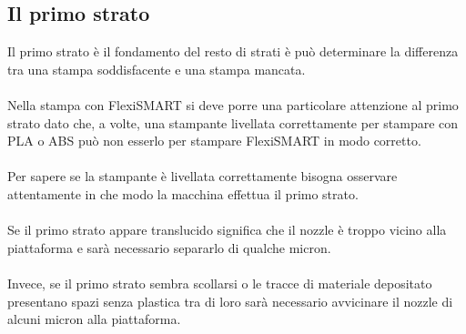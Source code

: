 \documentclass[11pt,a4paper]{article}
\begin{document}
	\subsection{Il primo strato}
Il primo strato è il fondamento del resto di strati è può determinare la differenza tra una stampa soddisfacente e una stampa mancata.
\\\\
Nella stampa con FlexiSMART si deve porre una particolare attenzione al primo strato dato che, a volte, una stampante livellata correttamente per stampare con PLA o ABS può non esserlo per stampare FlexiSMART in modo corretto.
\\\\
Per sapere se la stampante è livellata correttamente bisogna osservare attentamente in che modo la macchina effettua il primo strato.
\\\\
Se il primo strato appare translucido significa che il nozzle è troppo vicino alla piattaforma e sarà necessario separarlo di qualche micron.
\\\\
Invece, se il primo strato sembra scollarsi o le tracce di materiale depositato presentano spazi senza plastica tra di loro sarà necessario avvicinare il nozzle di alcuni micron alla piattaforma.
\end{document}
